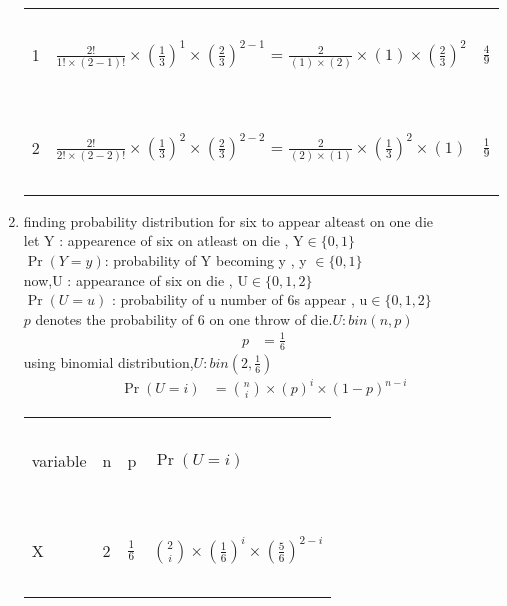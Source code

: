\documentclass[journal,12pt,onecolumn]{IEEEtran}
\providecommand{\pr}[1]{\ensuremath{\Pr\left(#1\right)}}
\providecommand{\brak}[1]{\ensuremath{\left(#1\right)}}
\theoremstyle{remark}
\begin{document}
\begin{enumerate}
\begin{tabular}{|l|l|l|}
 \hline
 \ & \ & \ \\
1 & \large $\frac{2!}{1!\times(2-1)!}\times\brak{\frac{1}{3}}^{1}\times\brak{\frac{2}{3}}^{2-1}$
= \large $\frac{2}{(1)\times(2)}\times(1)\times\brak{\frac{2}{3}}^{2}$ & \Large$\frac{4}{9}$ \\
\ & \ & \ \\
\hline
\ & \ & \ \\
2 & \large $\frac{2!}{2!\times(2-2)!}\times\brak{\frac{1}{3}}^{2}\times\brak{\frac{2}{3}}^{2-2}$ 
= \large $\frac{2}{(2)\times(1)}\times\brak{\frac{1}{3}}^{2}\times(1)$ & \Large $\frac{1}{9}$\\
\ & \ & \ \\
\hline
\end{tabular}
\vspace{2mm}

\item finding probability distribution for six to appear alteast on one die\\
let Y : appearence of six on atleast on die , Y$\in \{0,1\}$\\
$\pr{Y=y}$: probability of Y becoming y , y $\in \{ 0,1\}$ \\
now,U : appearance of six on die , U$\in \{0,1,2\}$\\
$\pr{U=u}$ : probability of u number of 6s appear  , u$\in \{0,1,2\}$\\
$p$ denotes the probability of 6 on one throw of die.$U:bin(n,p)$
\begin{align}
 p&=\frac{1}{6} 
\end{align}
using binomial distribution,$U:bin(2,\frac{1}{6})$
\begin{align}
\pr{U=i}&={n \choose i}\times(p)^i\times(1-p)^{n-i}
\end{align} 
\begin{tabular}{|l|l|l|l|}
\hline
\ &\ &\ &\ \\
\large variable & \large n & \large p & \large $\pr{U=i}$\\
\ & \ & \ & \  \\
\hline
\ &\ &\ &\ \\
\large {X} & \large{2} &  \large$\frac{1}{6}$ & \large${2 \choose i}\times \brak{\frac{1}{6}}^i\times\brak{\frac{5}{6}}^{2-i}$\\
\ & \ & \ & \  \\
\hline
\end{tabular}
\vspace{2mm}\\
\begin{tabular}{|l|l|l|}

\end{tabular}
\end{enumerate}
\end{document}
